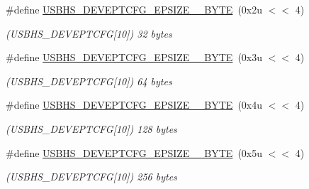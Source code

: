 \begin{DoxyCompactItemize}
\mbox{\label{group__SAMS70__USBHS_gab2e727848abe36c82c1ed5ab621a68a1}} 
\#define \mbox{\hyperlink{group__SAMS70__USBHS_gab2e727848abe36c82c1ed5ab621a68a1}{U\+S\+B\+H\+S\+\_\+\+D\+E\+V\+E\+P\+T\+C\+F\+G\+\_\+\+E\+P\+S\+I\+Z\+E\+\_\+\_\+\+B\+Y\+TE}}~(0x2u $<$$<$ 4)
\begin{DoxyCompactList}\small\item\em (U\+S\+B\+H\+S\+\_\+\+D\+E\+V\+E\+P\+T\+C\+FG\mbox{[}10\mbox{]}) 32 bytes \end{DoxyCompactList}\item 
\mbox{\label{group__SAMS70__USBHS_ga801cd9c63c16350a53e9bc2d92872980}} 
\#define \mbox{\hyperlink{group__SAMS70__USBHS_ga801cd9c63c16350a53e9bc2d92872980}{U\+S\+B\+H\+S\+\_\+\+D\+E\+V\+E\+P\+T\+C\+F\+G\+\_\+\+E\+P\+S\+I\+Z\+E\+\_\+\_\+\+B\+Y\+TE}}~(0x3u $<$$<$ 4)
\begin{DoxyCompactList}\small\item\em (U\+S\+B\+H\+S\+\_\+\+D\+E\+V\+E\+P\+T\+C\+FG\mbox{[}10\mbox{]}) 64 bytes \end{DoxyCompactList}\item 
\mbox{\label{group__SAMS70__USBHS_gaada6b4c339fd81152ebf6b88657ce678}} 
\#define \mbox{\hyperlink{group__SAMS70__USBHS_gaada6b4c339fd81152ebf6b88657ce678}{U\+S\+B\+H\+S\+\_\+\+D\+E\+V\+E\+P\+T\+C\+F\+G\+\_\+\+E\+P\+S\+I\+Z\+E\+\_\+\_\+\+B\+Y\+TE}}~(0x4u $<$$<$ 4)
\begin{DoxyCompactList}\small\item\em (U\+S\+B\+H\+S\+\_\+\+D\+E\+V\+E\+P\+T\+C\+FG\mbox{[}10\mbox{]}) 128 bytes \end{DoxyCompactList}\item 
\mbox{\label{group__SAMS70__USBHS_ga65463bfd966add42c50286017402b044}} 
\#define \mbox{\hyperlink{group__SAMS70__USBHS_ga65463bfd966add42c50286017402b044}{U\+S\+B\+H\+S\+\_\+\+D\+E\+V\+E\+P\+T\+C\+F\+G\+\_\+\+E\+P\+S\+I\+Z\+E\+\_\+\_\+\+B\+Y\+TE}}~(0x5u $<$$<$ 4)
\begin{DoxyCompactList}\small\item\em (U\+S\+B\+H\+S\+\_\+\+D\+E\+V\+E\+P\+T\+C\+FG\mbox{[}10\mbox{]}) 256 bytes \end{DoxyCompactList}\item 
\mbox{\label{group__SAMS70__USBHS_ga2d333b468cf7268f13cf096b3fab2467}} 

\end{DoxyCompactItemize}

